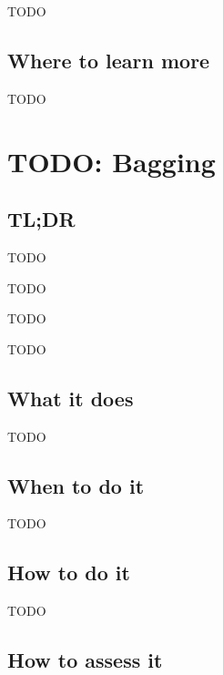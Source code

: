\documentclass[
]{book}
\providecommand{\tightlist}{%
  \setlength{\itemsep}{0pt}\setlength{\parskip}{0pt}}
\begin{document}
TODO

\hypertarget{where-to-learn-more-15}{%
\section{Where to learn more}\label{where-to-learn-more-15}}

TODO

\hypertarget{bagging}{%
\chapter{TODO: Bagging}\label{bagging}}

\hypertarget{tldr-16}{%
\section{TL;DR}\label{tldr-16}}

\begin{description}
\tightlist
\item[What it does]
TODO
\item[When to do it]
TODO
\item[How to do it]
TODO
\item[How to assess it]
TODO
\end{description}

\hypertarget{what-it-does-16}{%
\section{What it does}\label{what-it-does-16}}

TODO

\hypertarget{when-to-do-it-16}{%
\section{When to do it}\label{when-to-do-it-16}}

TODO

\hypertarget{how-to-do-it-16}{%
\section{How to do it}\label{how-to-do-it-16}}

TODO

\hypertarget{how-to-assess-it-16}{%
\section{How to assess it}\label{how-to-assess-it-16}}
\end{document}
